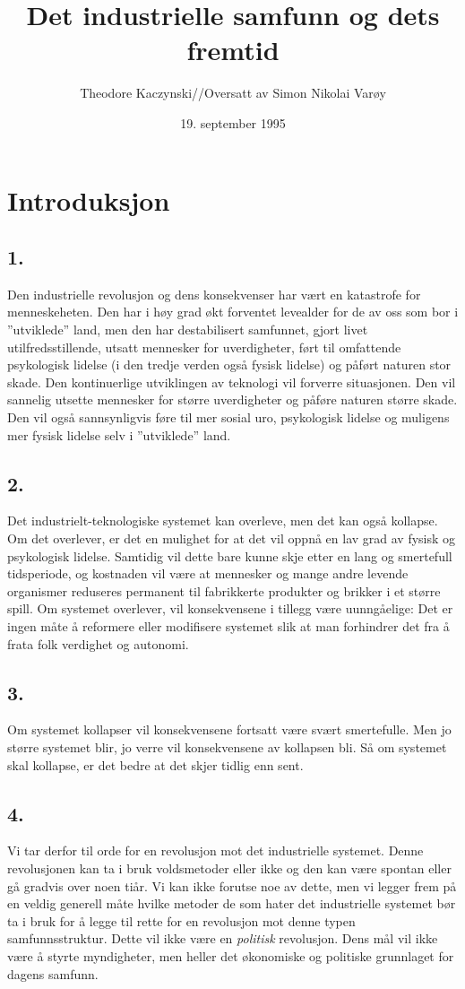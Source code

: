 \documentclass[oneside]{book}
\title{Det industrielle samfunn og dets fremtid}
\author{Theodore Kaczynski//Oversatt av Simon Nikolai Varøy}
\date{19. september 1995}
\begin{document}
\maketitle
\tableofcontents

\chapter{Introduksjon}
\section*{1.}
Den industrielle revolusjon og dens konsekvenser har vært en katastrofe for menneskeheten. Den har i høy grad økt forventet levealder for de av oss som bor i ''utviklede'' land, men den har destabilisert samfunnet, gjort livet utilfredsstillende, utsatt mennesker for uverdigheter, ført til omfattende psykologisk lidelse (i den tredje verden også fysisk lidelse) og påført naturen stor skade. Den kontinuerlige utviklingen av teknologi vil forverre situasjonen. Den vil sannelig utsette mennesker for større uverdigheter og påføre naturen større skade. Den vil også sannsynligvis føre til mer sosial uro, psykologisk lidelse og muligens mer fysisk lidelse selv i ''utviklede'' land.

\section*{2.}
Det industrielt-teknologiske systemet kan overleve, men det kan også kollapse. Om det overlever, er det en mulighet for at det vil oppnå en lav grad av fysisk og psykologisk lidelse. Samtidig vil dette bare kunne skje etter en lang og smertefull tidsperiode, og kostnaden vil være at mennesker og mange andre levende organismer reduseres permanent til fabrikkerte produkter og brikker i et større spill. Om systemet overlever, vil konsekvensene i tillegg være uunngåelige: Det er ingen måte å reformere eller modifisere systemet slik at man forhindrer det fra å frata folk verdighet og autonomi.

\section*{3.}
Om systemet kollapser vil konsekvensene fortsatt være svært smertefulle. Men jo større systemet blir, jo verre vil konsekvensene av kollapsen bli. Så om systemet skal kollapse, er det bedre at det skjer tidlig enn sent.

\section*{4.}
Vi tar derfor til orde for en revolusjon mot det industrielle systemet. Denne revolusjonen kan ta i bruk voldsmetoder eller ikke og den kan være spontan eller gå gradvis over noen tiår. Vi kan ikke forutse noe av dette, men vi legger frem på en veldig generell måte hvilke metoder de som hater det industrielle systemet bør ta i bruk for å legge til rette for en revolusjon mot denne typen samfunnsstruktur. Dette vil ikke være en {\em politisk} revolusjon. Dens mål vil ikke være å styrte myndigheter, men heller det økonomiske og politiske grunnlaget for dagens samfunn.
\end{document}
